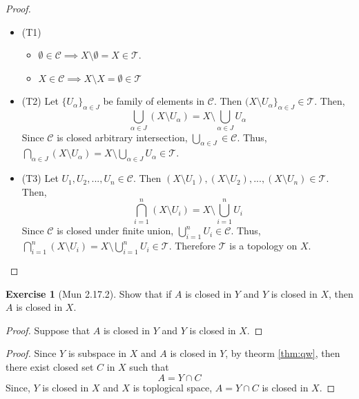 \documentclass[
]{book}
\providecommand{\tightlist}{%
  \setlength{\itemsep}{0pt}\setlength{\parskip}{0pt}}
\theoremstyle{definition}
\theoremstyle{definition}
\theoremstyle{definition}
\newtheorem{exercise}{Exercise}[chapter]
\theoremstyle{definition}
\theoremstyle{remark}
\begin{document}
\begin{proof}
\leavevmode

\begin{itemize}
\tightlist
\item
  (T1)

  \begin{itemize}
  \tightlist
  \item
    \(\emptyset \in \mathcal{C}\implies X\setminus \emptyset=X \in \mathcal{T}\).
  \item
    \(X \in \mathcal{C}\implies X\setminus X=\emptyset \in \mathcal{T}\)
  \end{itemize}
\item
  (T2)
  Let \(\{U_\alpha\}_{\alpha\in J}\) be family of elements in \(\mathcal{C}\). Then \((X\setminus U_\alpha\}_{\alpha\in J}\in \mathcal{T}\). Then,
  \[\bigcup_{\alpha\in J}(X\setminus U_\alpha)=X\setminus \bigcup_{\alpha\in J}U_\alpha\]
  Since \(\mathcal{C}\) is closed arbitrary intersection, \(\bigcup_{\alpha\in J}\in \mathcal{C}\). Thus,\(\bigcap_{\alpha\in J}(X\setminus U_\alpha)=X\setminus \bigcup_{\alpha\in J}U_\alpha\in \mathcal{T}\).
\item
  (T3)
  Let \(U_1,U_2,...,U_n\in \mathcal{C}\). Then \((X\setminus U_1),(X\setminus U_2),...,(X\setminus U_n)\in \mathcal{T}\). Then,
  \[\bigcap_{i=1}^n(X\setminus U_i)=X\setminus \bigcup_{i=1}^nU_i\]
  Since \(\mathcal{C}\) is closed under finite union, \(\bigcup_{i=1}^nU_i\in \mathcal{C}\). Thus,\(\bigcap_{i=1}^n(X\setminus U_i)=X\setminus \bigcup_{i=1}^nU_i\in \mathcal{T}\).
  Therefore \(\mathcal{T}\) is a topology on \(X\).
\end{itemize}

\end{proof}

\begin{exercise}[Mun 2.17.2]
\protect\hypertarget{exr:unnamed-chunk-98}{}\label{exr:unnamed-chunk-98}Show that if \(A\) is closed in \(Y\) and \(Y\) is closed in \(X\), then \(A\) is closed in \(X\).
\end{exercise}

\begin{proof}
Suppose that \(A\) is closed in \(Y\) and \(Y\) is closed in \(X\).
\end{proof}

\begin{proof}
Since \(Y\) is subspace in \(X\) and \(A\) is closed in \(Y\), by theorm \ref{thm:qw}, then there exist closed set \(C\) in \(X\) such that \[A=Y\cap C\]
Since, \(Y\) is closed in \(X\) and \(X\) is toplogical space, \(A=Y\cap C\) is closed in \(X\).
\end{proof}

  
\end{document}
